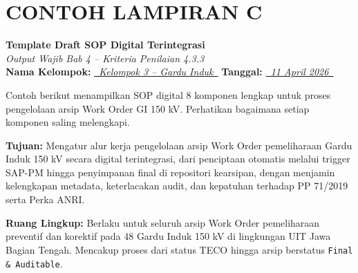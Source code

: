 \documentclass[12pt,a4paper]{report}
\begin{document}
\newpage
\section*{\color{plnblue} CONTOH LAMPIRAN C}
{\Large\bfseries Template Draft SOP Digital Terintegrasi}\\[0.15cm]
{\normalsize\color{medgray}\textit{Output Wajib Bab 4 -- Kriteria Penilaian 4.3.3}}\\[0.4cm]

\noindent\textbf{Nama Kelompok:} \underline{\textit{~Kelompok 3 -- Gardu Induk~}} \quad \textbf{Tanggal:} \underline{\textit{~11 April 2026~}}

\vspace{0.3cm}

\begin{contohbox}
Contoh berikut menampilkan SOP digital 8 komponen lengkap untuk proses pengelolaan arsip Work Order GI 150 kV. Perhatikan bagaimana setiap komponen saling melengkapi.
\end{contohbox}

\vspace{0.3cm}

\begin{tcolorbox}[colback=fillgreen, colframe=plnblue!50, sharp corners, title={\small\bfseries Komponen 1: Tujuan \& Ruang Lingkup}]
\small
\textbf{Tujuan:} Mengatur alur kerja pengelolaan arsip Work Order pemeliharaan Gardu Induk 150 kV secara digital terintegrasi, dari penciptaan otomatis melalui trigger SAP-PM hingga penyimpanan final di repositori kearsipan, dengan menjamin kelengkapan metadata, keterlacakan audit, dan kepatuhan terhadap PP 71/2019 serta Perka ANRI.

\vspace{0.2cm}
\textbf{Ruang Lingkup:} Berlaku untuk seluruh arsip Work Order pemeliharaan preventif dan korektif pada 48 Gardu Induk 150 kV di lingkungan UIT Jawa Bagian Tengah. Mencakup proses dari status TECO hingga arsip berstatus \texttt{Final \& Auditable}.
\end{tcolorbox}
\end{document}
